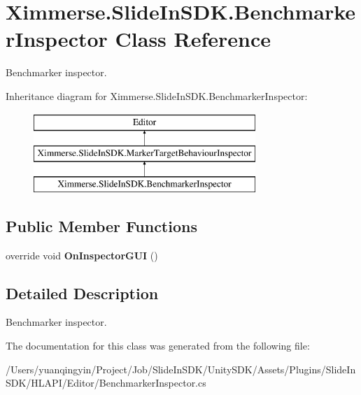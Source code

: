 \hypertarget{class_ximmerse_1_1_slide_in_s_d_k_1_1_benchmarker_inspector}{}\section{Ximmerse.\+Slide\+In\+S\+D\+K.\+Benchmarker\+Inspector Class Reference}
\label{class_ximmerse_1_1_slide_in_s_d_k_1_1_benchmarker_inspector}


Benchmarker inspector.  


Inheritance diagram for Ximmerse.\+Slide\+In\+S\+D\+K.\+Benchmarker\+Inspector\+:\begin{figure}[H]
\begin{center}
\leavevmode
\includegraphics[height=3.000000cm]{class_ximmerse_1_1_slide_in_s_d_k_1_1_benchmarker_inspector}
\end{center}
\end{figure}
\subsection*{Public Member Functions}
\begin{DoxyCompactItemize}
\item 
\mbox{\label{class_ximmerse_1_1_slide_in_s_d_k_1_1_benchmarker_inspector_a88587f5e7b377a27d9c5a1ca7438c081}} 
override void {\bfseries On\+Inspector\+G\+UI} ()
\end{DoxyCompactItemize}


\subsection{Detailed Description}
Benchmarker inspector. 



The documentation for this class was generated from the following file\+:\begin{DoxyCompactItemize}
\item 
/\+Users/yuanqingyin/\+Project/\+Job/\+Slide\+In\+S\+D\+K/\+Unity\+S\+D\+K/\+Assets/\+Plugins/\+Slide\+In\+S\+D\+K/\+H\+L\+A\+P\+I/\+Editor/Benchmarker\+Inspector.\+cs\end{DoxyCompactItemize}
